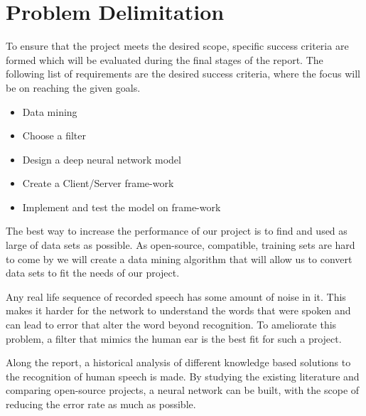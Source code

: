\section{Problem Delimitation}
To ensure that the project meets the desired scope,
specific success criteria are formed which will be
evaluated during the final stages of the report.
The following list of requirements are the desired
success criteria, where the focus will be on reaching
the given goals.

\begin{itemize}
	\item Data mining
	\item Choose a filter
	\item Design a deep neural network model
	\item Create a Client/Server frame-work
	\item Implement and test the model on frame-work
\end{itemize}

The best way to increase the performance of our project is to find and used as large of data sets as possible. As open-source, compatible, training sets are hard to come by we will create a data mining algorithm
that will allow us to convert data sets to fit the needs of our project.

Any real life sequence of recorded speech has some amount of noise in 
it. This makes it harder for the network to understand the words that
were spoken and can lead to error that alter the word beyond 
recognition. To ameliorate this problem, a filter that mimics the human
ear is the best fit for such a project.

Along the report, a historical analysis of different knowledge
based solutions to the recognition of human speech is made.  By studying
the existing literature and comparing open-source projects, a neural 
network can be built, with the scope of reducing the error rate as much
as possible.



